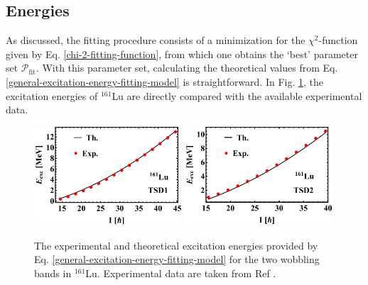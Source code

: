 \subsection{Energies}

As discussed, the fitting procedure consists of a minimization for the $\chi^2$-function given by Eq. \ref{chi-2-fitting-function}, from which one obtains the `best' parameter set $\mathcal{P}_\text{fit}$. With this parameter set, calculating the theoretical values from Eq. \ref{general-excitation-energy-fitting-model} is straightforward. In Fig. \ref{excitation-energies-th-161Lu}, the excitation energies of $^{161}$Lu are directly compared with the available experimental data.
\begin{figure}
    \centering
    \includegraphics[width=0.49\textwidth]{Chapters/Figures/Lu-exp-energies/fig2a_lu161.pdf}
    \includegraphics[width=0.49\textwidth]{Chapters/Figures/Lu-exp-energies/fig2b_lu161.pdf}
    \caption{The experimental and theoretical excitation energies provided by Eq. \ref{general-excitation-energy-fitting-model} for the two wobbling bands in $^{161}$Lu. Experimental data are taken from Ref \cite{bringel2005evidence}.}
    \label{excitation-energies-th-161Lu}
\end{figure}

